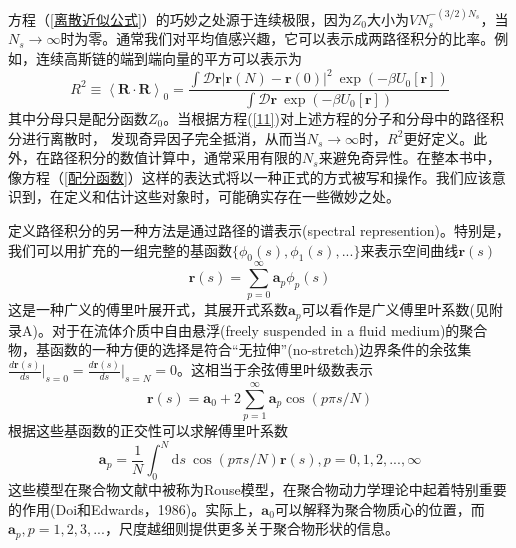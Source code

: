 方程（\ref{离散近似公式}）的巧妙之处源于连续极限，因为$Z_0$大小为$VN_s^{−(3/2)N_s}$，当$N_s\rightarrow \infty$时为零。通常我们对平均值感兴趣，它可以表示成两路径积分的比率。例如，连续高斯链的端到端向量的平方可以表示为
\begin{equation}
R^2\equiv \left \langle \mathbf{R}\cdot \mathbf{R}\right \rangle _0=\frac{\int \mathcal{D}\mathbf{r}\left| \mathbf{r}(N)-\mathbf{r}(0) \right|^2~\exp(-\beta U_0[\mathbf{r}])}{\int \mathcal{D}\mathbf{r}~\exp(-\beta U_0[\mathbf{r}])} 　\label{11}
\end{equation}
其中分母只是配分函数$Z_0$。当根据方程(\ref{11})对上述方程的分子和分母中的路径积分进行离散时，
发现奇异因子完全抵消，从而当$N_s\rightarrow \infty$时，$R^2$更好定义。此外，在路径积分的数值计算中，通常采用有限的$N_s$来避免奇异性。在整本书中，像方程（\ref{配分函数}）这样的表达式将以一种正式的方式被写和操作。我们应该意识到，在定义和估计这些对象时，可能确实存在一些微妙之处。

定义路径积分的另一种方法是通过路径的谱表示(spectral represention)。特别是，我们可以用扩充的一组完整的基函数$\lbrace \phi _0(s),\phi _1(s),... \rbrace$来表示空间曲线$\mathbf{r}(s)$
\begin{equation}
\mathbf{r}(s)=\sum_{p=0}^{\infty} \mathbf{a}_p \phi _p(s)
\end{equation}
这是一种广义的傅里叶展开式，其展开式系数$\mathbf{a}_p$可以看作是广义傅里叶系数(见附录A)。对于在流体介质中自由悬浮(freely suspended in a fluid medium)的聚合物，基函数的一种方便的选择是符合“无拉伸”(no-stretch)边界条件的余弦集$\frac{d\mathbf{r}(s)}{ds}\vert _{s=0}=\frac{d\mathbf{r}(s)}{ds}\vert _{s=N}=0$。这相当于余弦傅里叶级数表示
\begin{equation}
\mathbf{r}(s)=\mathbf{a}_0+2\sum_{p=1}^{\infty} \mathbf{a}_p \cos(p\pi s/N)
\end{equation}
根据这些基函数的正交性可以求解傅里叶系数
\begin{equation}
\mathbf{a}_p=\frac{1}{N}\int_{0}^{N}  \mathrm{d}s~\cos(p\pi s/N)\mathbf{r}(s),p=0,1,2,...,\infty
\end{equation}
这些模型在聚合物文献中被称为Rouse模型，在聚合物动力学理论中起着特别重要的作用(Doi和Edwards，1986)。实际上，$\mathbf{a}_0$可以解释为聚合物质心的位置，而$\mathbf{a}_p,p=1,2,3,...$，尺度越细则提供更多关于聚合物形状的信息。


